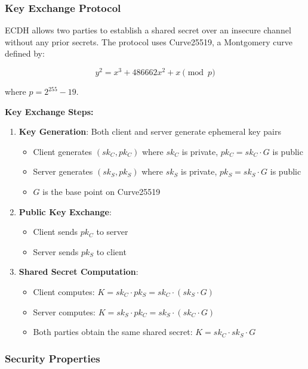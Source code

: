 \documentclass[12pt,a4paper]{article}
\begin{document}
\subsubsection{Key Exchange Protocol}

ECDH allows two parties to establish a shared secret over an insecure channel without any prior secrets. The protocol uses Curve25519, a Montgomery curve defined by:

\begin{equation}
y^2 = x^3 + 486662x^2 + x \pmod{p}
\end{equation}

where $p = 2^{255} - 19$.

\textbf{Key Exchange Steps:}

\begin{enumerate}
    \item \textbf{Key Generation}: Both client and server generate ephemeral key pairs
    \begin{itemize}
        \item Client generates $(sk_C, pk_C)$ where $sk_C$ is private, $pk_C = sk_C \cdot G$ is public
        \item Server generates $(sk_S, pk_S)$ where $sk_S$ is private, $pk_S = sk_S \cdot G$ is public
        \item $G$ is the base point on Curve25519
    \end{itemize}
    
    \item \textbf{Public Key Exchange}:
    \begin{itemize}
        \item Client sends $pk_C$ to server
        \item Server sends $pk_S$ to client
    \end{itemize}
    
    \item \textbf{Shared Secret Computation}:
    \begin{itemize}
        \item Client computes: $K = sk_C \cdot pk_S = sk_C \cdot (sk_S \cdot G)$
        \item Server computes: $K = sk_S \cdot pk_C = sk_S \cdot (sk_C \cdot G)$
        \item Both parties obtain the same shared secret: $K = sk_C \cdot sk_S \cdot G$
    \end{itemize}
\end{enumerate}

\subsubsection{Security Properties}
\end{document}
